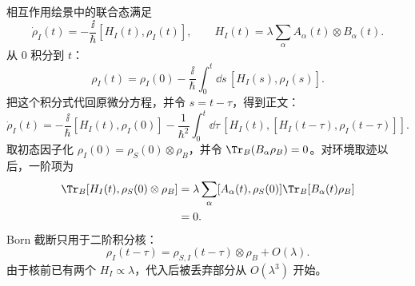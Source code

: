 \begin{derivation}[弱耦合展开怎样保留环境记忆]
相互作用绘景中的联合态满足
\[
\dot\rho_I(t)=-\frac{\ii}{\hbar}[H_I(t),\rho_I(t)],
\qquad
H_I(t)=\lambda\sum_\alpha A_\alpha(t)\otimes B_\alpha(t).
\]
从 $0$ 积分到 $t$：
\[
\rho_I(t)=\rho_I(0)
-\frac{\ii}{\hbar}\int_0^t\dd s\,[H_I(s),\rho_I(s)].
\]
把这个积分式代回原微分方程，并令 $s=t-\tau$，得到正文：
\[
\dot\rho_I(t)
=-\frac{\ii}{\hbar}[H_I(t),\rho_I(0)]
-\frac1{\hbar^2}\int_0^t\dd\tau\,
[H_I(t),[H_I(t-\tau),\rho_I(t-\tau)]].
\]
取初态因子化 $\rho_I(0)=\rho_S(0)\otimes\rho_B$，并令
$\Tr_B(B_\alpha\rho_B)=0$。对环境取迹以后，一阶项为
\begin{align*}
\Tr_B[H_I(t),\rho_S(0)\otimes\rho_B]
&=\lambda\sum_\alpha
[A_\alpha(t),\rho_S(0)]\Tr_B[B_\alpha(t)\rho_B]\\
&=0.
\end{align*}
Born 截断只用于二阶积分核：
\[
\rho_I(t-\tau)
=\rho_{S,I}(t-\tau)\otimes\rho_B+O(\lambda).
\]
由于核前已有两个 $H_I\propto\lambda$，代入后被丢弃部分从 $O(\lambda^3)$ 开始。


\end{derivation}

